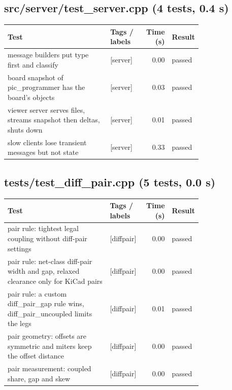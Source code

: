 \subsection*{src/\allowbreak{}server/\allowbreak{}test\_\allowbreak{}server.cpp (4 tests, 0.4 s)}
\begin{longtable}{@{}p{0.57\linewidth}p{0.19\linewidth}rl@{}}
\toprule Test & Tags / labels & Time (s) & Result \\ \midrule \endhead
message builders put type first and classify & {\footnotesize [server]} & 0.00 & passed \\
board snapshot of pic\_programmer has the board's objects & {\footnotesize [server]} & 0.03 & passed \\
viewer server serves files, streams snapshot then deltas, shuts down & {\footnotesize [server]} & 0.01 & passed \\
slow clients lose transient messages but not state & {\footnotesize [server]} & 0.33 & passed \\
\bottomrule\end{longtable}
\subsection*{tests/\allowbreak{}test\_\allowbreak{}diff\_\allowbreak{}pair.cpp (5 tests, 0.0 s)}
\begin{longtable}{@{}p{0.57\linewidth}p{0.19\linewidth}rl@{}}
\toprule Test & Tags / labels & Time (s) & Result \\ \midrule \endhead
pair rule: tightest legal coupling without diff-pair settings & {\footnotesize [diffpair]} & 0.00 & passed \\
pair rule: net-class diff-pair width and gap, relaxed clearance only for KiCad pairs & {\footnotesize [diffpair]} & 0.00 & passed \\
pair rule: a custom diff\_pair\_gap rule wins, diff\_pair\_uncoupled limits the legs & {\footnotesize [diffpair]} & 0.01 & passed \\
pair geometry: offsets are symmetric and miters keep the offset distance & {\footnotesize [diffpair]} & 0.00 & passed \\
pair measurement: coupled share, gap and skew & {\footnotesize [diffpair]} & 0.00 & passed \\
\bottomrule\end{longtable}
